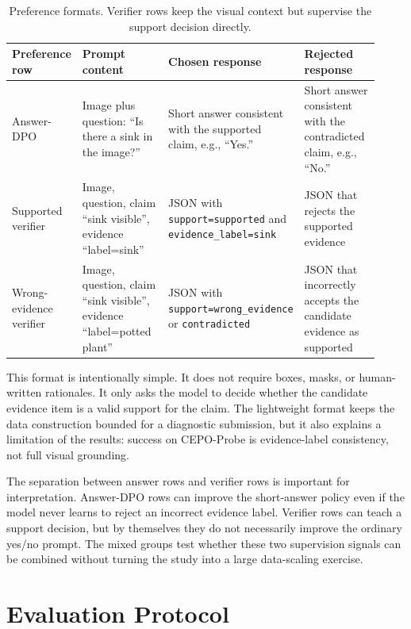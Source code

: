 \documentclass[10pt,twocolumn,letterpaper]{article}
\newcommand{\benchmark}{CEPO-Probe}
\begin{document}
\begin{table}[t]
\centering
\footnotesize
\setlength{\tabcolsep}{4pt}
\begin{tabular}{@{}p{0.17\linewidth}p{0.27\linewidth}p{0.25\linewidth}p{0.23\linewidth}@{}}
\toprule
Preference row & Prompt content & Chosen response & Rejected response \\
\midrule
Answer-DPO &
Image plus question: ``Is there a sink in the image?'' &
Short answer consistent with the supported claim, e.g., ``Yes.'' &
Short answer consistent with the contradicted claim, e.g., ``No.'' \\
Supported verifier &
Image, question, claim ``sink visible'', evidence ``label=sink'' &
JSON with \texttt{support=supported} and \texttt{evidence\_label=sink} &
JSON that rejects the supported evidence \\
Wrong-evidence verifier &
Image, question, claim ``sink visible'', evidence ``label=potted plant'' &
JSON with \texttt{support=wrong\_evidence} or \texttt{contradicted} &
JSON that incorrectly accepts the candidate evidence as supported \\
\bottomrule
\end{tabular}
\caption{Preference formats. Verifier rows keep the visual context but
supervise the support decision directly.}
\label{tab:format}
\end{table}

This format is intentionally simple. It does not require boxes, masks, or
human-written rationales. It only asks the model to decide whether the
candidate evidence item is a valid support for the claim. The lightweight
format keeps the data construction bounded for a diagnostic submission,
but it also explains a limitation of the results: success on \benchmark{} is
evidence-label consistency, not full visual grounding.

The separation between answer rows and verifier rows is important for
interpretation. Answer-DPO rows can improve the short-answer policy even if the
model never learns to reject an incorrect evidence label. Verifier rows can
teach a support decision, but by themselves they do not necessarily improve the
ordinary yes/no prompt. The mixed groups test whether these two supervision
signals can be combined without turning the study into a large data-scaling
exercise.

\section{Evaluation Protocol}
\end{document}
